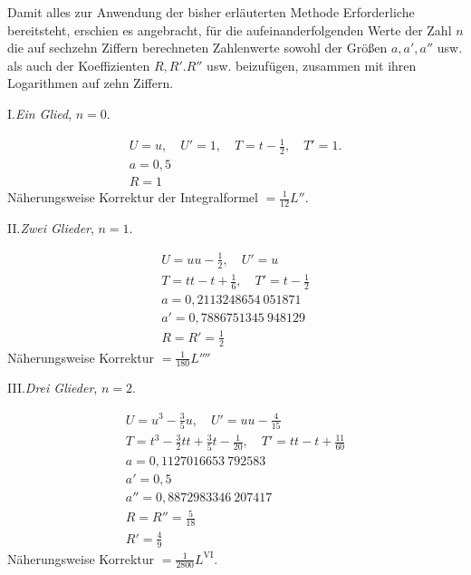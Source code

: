 Damit alles zur Anwendung der bisher erläuterten Methode Erforderliche bereitsteht, erschien es angebracht, für die aufeinanderfolgenden Werte der Zahl $n$ die auf sechzehn Ziffern berechneten Zahlenwerte sowohl der Größen $a,a',a''$ usw. als auch der Koeffizienten $R,R'.R''$ usw. beizufügen, zusammen mit ihren Logarithmen auf zehn Ziffern.
\begingroup\renewcommand{\arraystretch}{1.6}
\par{}\begin{center}I.\quad\textit{Ein Glied}, \(n=0\).\end{center}
\[
\begin{array}{l}
U=u,\quad U'=1,\quad T=t-\frac{1}{2},\quad T'=1.\\
a=0{,}5\\
R=1
\end{array}
\]
\noindent Näherungsweise Korrektur der Integralformel \(=\frac{1}{12}L''\).

\par{}\begin{center}II.\quad\textit{Zwei Glieder}, \(n=1\).\end{center}
\[
\begin{array}{l}
U=uu-\frac{1}{2},\quad U'=u\\
T=tt-t+\frac{1}{6},\quad T'=t-\frac{1}{2}\\
a=0{,}2113248654\ 051871\\
a'=0{,}7886751345\ 948129\\
R=R'=\frac{1}{2}
\end{array}
\]
\noindent Näherungsweise Korrektur \(=\frac{1}{180}L''''\)

\par{}\begin{center}III.\quad\textit{Drei Glieder}, \(n=2\).\end{center}
\[
\begin{array}{l}
U=u^3-\frac{3}{5}u,\quad U'=uu-\frac{4}{15}\\
T=t^3-\frac{3}{2}tt+\frac{3}{5}t-\frac{1}{20},\quad T'=tt-t+\frac{11}{60}\\
a=0{,}1127016653\ 792583\\
a'=0{,}5\\
a''=0{,}8872983346\ 207417\\
R=R''=\frac{5}{18}\\
R'=\frac{4}{9}
\end{array}
\]
\noindent Näherungsweise Korrektur \(=\frac{1}{2800}L^{\mathrm{VI}}\).

